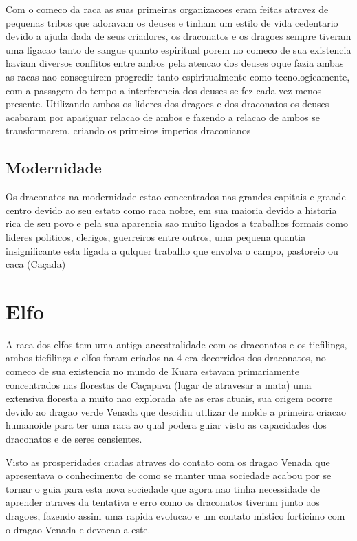 \documentclass{book}
\begin{document}
Com o comeco da raca as suas primeiras organizacoes eram feitas atravez de pequenas tribos que 
adoravam os deuses e tinham um estilo de vida cedentario devido a ajuda dada de seus 
criadores, os draconatos e os dragoes sempre tiveram uma ligacao tanto de sangue quanto 
espiritual porem no comeco de sua existencia haviam diversos conflitos entre ambos pela 
atencao dos deuses oque fazia ambas as racas nao conseguirem progredir tanto espiritualmente 
como tecnologicamente, com a passagem do tempo a interferencia dos deuses se fez cada vez 
menos presente. Utilizando ambos os lideres dos dragoes e dos draconatos os deuses acabaram 
por apasiguar relacao de ambos e fazendo a relacao de ambos se transformarem, criando os 
primeiros imperios draconianos 

\subsection*{Modernidade}
Os draconatos na modernidade estao concentrados nas grandes capitais e grande centro devido ao 
seu estato como raca nobre, em sua maioria devido a historia rica de seu povo e pela sua 
aparencia sao muito ligados a trabalhos formais como lideres politicos, clerigos, guerreiros 
entre outros, uma pequena quantia insignificante esta ligada a qulquer trabalho que envolva o 
campo, pastoreio ou caca (Caçada)

\section{Elfo}
A raca dos elfos tem uma antiga ancestralidade com os draconatos e os tiefilings, ambos tiefilings 
e elfos foram criados na 4 era decorridos dos draconatos, no comeco de sua existencia no mundo 
de Kuara estavam primariamente concentrados nas florestas de Caçapava (lugar de atravesar a mata)
uma extensiva floresta a muito nao explorada ate as eras atuais, sua origem ocorre devido ao 
dragao verde Venada que descidiu utilizar de molde a primeira criacao humanoide para ter uma 
raca ao qual podera guiar visto as capacidades dos draconatos e de seres censientes. 

Visto as prosperidades criadas atraves do contato com os dragao Venada que apresentava o 
conhecimento de como se manter uma sociedade acabou por se tornar o guia para esta nova
sociedade que agora nao tinha necessidade de aprender atraves da tentativa e erro como os 
draconatos tiveram junto aos dragoes, fazendo assim uma rapida evolucao e um contato mistico 
forticimo com o dragao Venada e devocao a este.
\end{document}
